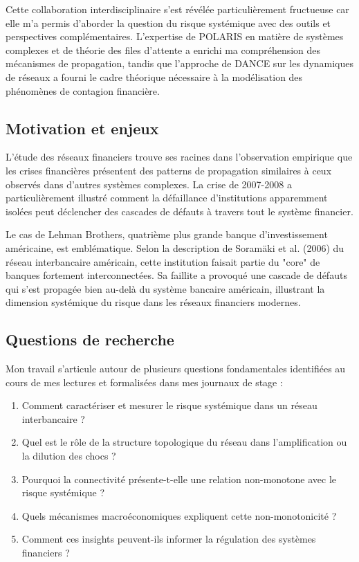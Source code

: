 \documentclass[12pt,a4paper,twoside]{article}
\begin{document}
Cette collaboration interdisciplinaire s'est révélée particulièrement fructueuse car elle m'a permis d'aborder la question du risque systémique avec des outils et perspectives complémentaires. L'expertise de POLARIS en matière de systèmes complexes et de théorie des files d'attente a enrichi ma compréhension des mécanismes de propagation, tandis que l'approche de DANCE sur les dynamiques de réseaux a fourni le cadre théorique nécessaire à la modélisation des phénomènes de contagion financière.

\subsection{Motivation et enjeux}

L'étude des réseaux financiers trouve ses racines dans l'observation empirique que les crises financières présentent des patterns de propagation similaires à ceux observés dans d'autres systèmes complexes. La crise de 2007-2008 a particulièrement illustré comment la défaillance d'institutions apparemment isolées peut déclencher des cascades de défauts à travers tout le système financier.

Le cas de Lehman Brothers, quatrième plus grande banque d'investissement américaine, est emblématique. Selon la description de Soramäki et al. (2006) du réseau interbancaire américain, cette institution faisait partie du "core" de banques fortement interconnectées. Sa faillite a provoqué une cascade de défauts qui s'est propagée bien au-delà du système bancaire américain, illustrant la dimension systémique du risque dans les réseaux financiers modernes.

\subsection{Questions de recherche}

Mon travail s'articule autour de plusieurs questions fondamentales identifiées au cours de mes lectures et formalisées dans mes journaux de stage :

\begin{enumerate}
\item Comment caractériser et mesurer le risque systémique dans un réseau interbancaire ?
\item Quel est le rôle de la structure topologique du réseau dans l'amplification ou la dilution des chocs ?
\item Pourquoi la connectivité présente-t-elle une relation non-monotone avec le risque systémique ?
\item Quels mécanismes macroéconomiques expliquent cette non-monotonicité ?
\item Comment ces insights peuvent-ils informer la régulation des systèmes financiers ?
\end{enumerate}
\end{document}

